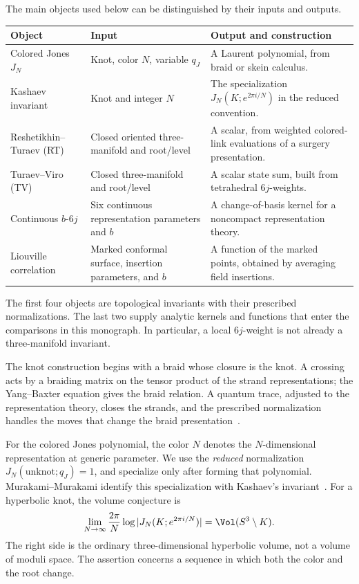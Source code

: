 The main objects used below can be distinguished by their inputs and
outputs.
\begin{center}
\small
\begin{tabular}{@{}>{\raggedright\arraybackslash}p{}>{\raggedright\arraybackslash}p{}>{\raggedright\arraybackslash}p{}@{}}
\toprule
Object & Input & Output and construction\\
\midrule
Colored Jones $J_N$ & Knot, color $N$, variable $q_J$
& A Laurent polynomial, from braid or skein calculus.\\[4pt]
Kashaev invariant & Knot and integer $N$
& The specialization $J_N(K;e^{2\pi i/N})$ in the reduced convention.\\[4pt]
Reshetikhin--Turaev (RT) & Closed oriented three-manifold and root/level
& A scalar, from weighted colored-link evaluations of a surgery presentation.\\[4pt]
Turaev--Viro (TV) & Closed three-manifold and root/level
& A scalar state sum, built from tetrahedral $6j$-weights.\\[4pt]
Continuous $b$-$6j$ & Six continuous representation parameters and $b$
& A change-of-basis kernel for a noncompact representation theory.\\[4pt]
Liouville correlation & Marked conformal surface, insertion parameters, and $b$
& A function of the marked points, obtained by averaging field insertions.\\
\bottomrule
\end{tabular}
\end{center}
The first four objects are topological invariants with their prescribed
normalizations. The last two supply analytic kernels and functions
that enter the comparisons in this monograph. In particular, a local
$6j$-weight is not already a three-manifold invariant.

The knot construction begins with a braid whose closure is the knot.
A crossing acts by a braiding matrix on the tensor product of the
strand representations; the Yang--Baxter equation gives the braid
relation. A quantum trace, adjusted to the representation theory,
closes the strands, and the prescribed normalization handles the
moves that change the braid presentation~\cite[Section 2]{MurakamiIntro}.

For the colored Jones polynomial, the color $N$ denotes the
$N$-dimensional representation at generic parameter. We use the
\emph{reduced} normalization $J_N(\text{unknot};q_J)=1$, and specialize
only after forming that polynomial. Murakami--Murakami identify this
specialization with Kashaev's invariant~\cite{MurakamiMurakami}.
For a hyperbolic knot, the volume conjecture is
\begin{equation}
 \lim_{N\to\infty}\frac{2\pi}{N}
 \log|J_N(K;e^{2\pi i/N})|=\Vol(S^3\setminus K).
 \label{eq:introknotvolume}
\end{equation}
The right side is the ordinary three-dimensional hyperbolic volume,
not a volume of moduli space. The assertion concerns a sequence in
which both the color and the root change.

